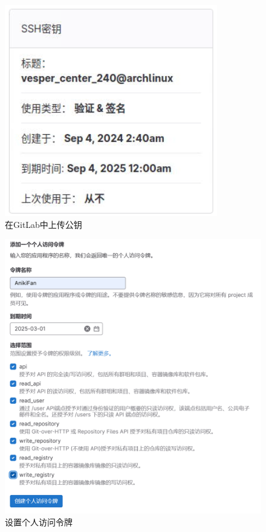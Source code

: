 \begin{figure}[!htbp]
    \centering
    \includegraphics[scale=1]{fig/setCode.png}
    \caption{在GitLab中上传公钥}\label{setCode}
\end{figure}

\begin{figure}[!htbp]
    \centering
    \includegraphics[scale=0.4]{fig/setToken.png}
    \caption{设置个人访问令牌}\label{setToken}
\end{figure}

